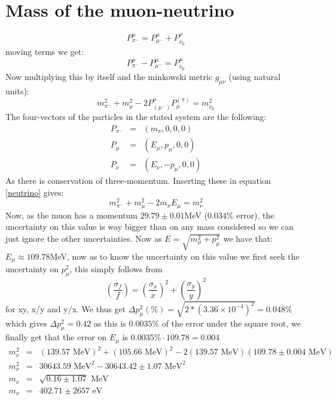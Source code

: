 \documentclass[10pt,a4paper,twoside]{article}
\begin{document}
\section{Mass of the muon-neutrino}
\begin{equation}
	P^{\mu}_{\pi^-} = P^{\mu}_{\mu^-} + P^{\mu}_{\bar{\nu}_{\mu}}
\end{equation}
moving terms we get:
\begin{equation}
P^{\mu}_{\pi^-} - P^{\mu}_{\mu^-} = P^{\mu}_{\bar{\nu}_{\mu}}
\end{equation}
Now multiplying this by itself and the minkowski metric $g_{\mu\nu}$ (using natural units):
\begin{equation}
	m_{\pi^-}^2 + m_{\mu}^2 - 2P^{\mu}_{(\mu^-)}P_{\mu}^{(\pi)} = m_{\bar{\nu}_{\mu}}^2
	\label{neutrino}
\end{equation}
The four-vectors of the particles in the stated system are the following:
\begin{eqnarray}
	P_{\pi^-} &=& (m_{\pi},0,0,0)\\
	P_{\mu} &=& (E_{\mu},p_{\mu},0,0)\\
	P_{\nu} &=& (E_{\nu},-p_{\mu},0,0)
\end{eqnarray}
As there is conservation of three-momentum. Inserting these in equation \ref{neutrino} gives:
\begin{equation}
	m_{\pi^-}^2 + m_{\mu}^2 - 2m_{\pi}E_{\mu} = m_{\nu}^2
\end{equation}
Now, as the muon has a momentum $29.79 \pm 0.01$MeV ($0.034\%$ error), the uncertainty on this value is way bigger than on any mass considered so we can just ignore the other uncertainties. Now as $E = \sqrt{m_{\mu}^2 + p_{\mu}^2}$ we have that: $E_{\mu} \approx 109.78$MeV, now as to know the uncertainty on this value we first seek the uncertainty on $p_{\mu}^2$, this simply follows from
\begin{equation}
	\left(\frac{\sigma_f}{f}\right) = \left(\frac{\sigma_x}{x}\right)^2 + \left(\frac{\sigma_y}{y}\right)^2
\end{equation}
for xy, x/y and y/x. We thus get $\Delta p_{\mu}^2(\%) = \sqrt{2*(3.36\times10^{-4})^2} = 0.048\%$ which gives $\Delta p_{\mu}^2 = 0.42$ as this is $0.0035\%$ of the error under the square root, we finally get that the error on $E_{\mu}$ is $0.0035\% \cdot 109.78 = 0.004$
\begin{eqnarray}
	m_{\nu}^2 &=& (139.57\text{ MeV})^2 + (105.66\text{ MeV})^2 - 2(139.57\text{ MeV})(109.78\pm0.004\text{ MeV})\\
	m_{\nu}^2 &=& 30643.59\text{ MeV}^2 - 30643.42\pm1.07\text{ MeV}^2\\
	m_{\nu} &=& \sqrt{0.16\pm1.07}\text{ MeV}\\
	m_{\nu} &=& 402.71\pm2657\text{ eV}
\end{eqnarray}
\end{document}
